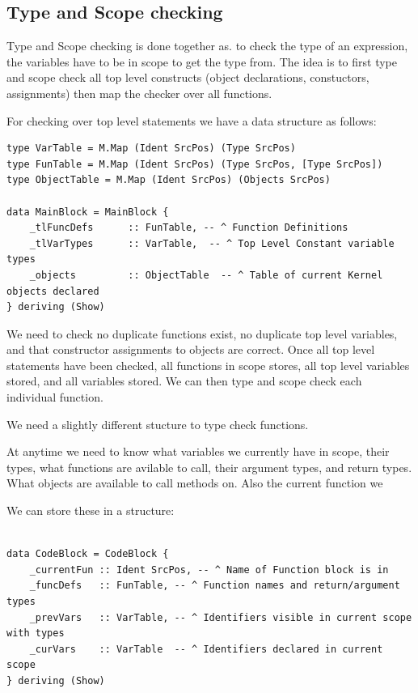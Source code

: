 \subsection{Type and Scope checking}

Type and Scope checking is done together as. to check the type of
an expression, the variables have to be in scope to get the type from.
The idea is to first type and scope check all top level constructs (object declarations, constuctors,
assignments) then map the checker over all functions.

For checking over top level statements we have a data structure as follows:

\begin{lstlisting}[style=myHaskell]
type VarTable = M.Map (Ident SrcPos) (Type SrcPos)
type FunTable = M.Map (Ident SrcPos) (Type SrcPos, [Type SrcPos])
type ObjectTable = M.Map (Ident SrcPos) (Objects SrcPos)

data MainBlock = MainBlock {
    _tlFuncDefs      :: FunTable, -- ^ Function Definitions
    _tlVarTypes      :: VarTable,  -- ^ Top Level Constant variable types
    _objects         :: ObjectTable  -- ^ Table of current Kernel objects declared 
} deriving (Show)
\end{lstlisting}

We need to check no duplicate functions exist, no duplicate top level variables,
and that constructor assignments to objects are correct. Once all top level statements have
been checked, all functions in scope stores, all top level variables stored, and all variables stored.
We can then type and scope check each individual function.

We need a slightly different stucture to type check functions.

At anytime we need to know what variables we currently have in scope, their types,
what functions are avilable to call, their argument types, and return types. What objects
are available to call methods on. Also the current function we 

We can store these in a structure:

\begin{lstlisting}[style=myHaskell]

data CodeBlock = CodeBlock {
    _currentFun :: Ident SrcPos, -- ^ Name of Function block is in
    _funcDefs   :: FunTable, -- ^ Function names and return/argument types
    _prevVars   :: VarTable, -- ^ Identifiers visible in current scope with types
    _curVars    :: VarTable  -- ^ Identifiers declared in current scope
} deriving (Show)


\end{lstlisting}


